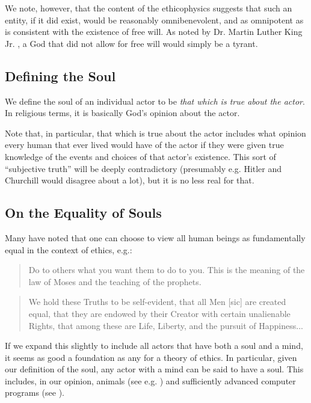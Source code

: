 \documentclass{article}
\begin{document}
We note, however, that the content of the ethicophysics suggests that
such an entity, if it did exist, would be reasonably omnibenevolent,
and as omnipotent as is consistent with the existence of free will.
As noted by Dr. Martin Luther King Jr. \cite{king1963tough}, a God that
did not allow for free will would simply be a tyrant.

\subsection{Defining the Soul}

We define the soul of an individual actor to be {\em that which is
  true about the actor}. In religious terms, it is basically God's
opinion about the actor.

Note that, in particular, that which is true about the actor includes
what opinion every human that ever lived would have of the actor if
they were given true knowledge of the events and choices of that
actor's existence. This sort of ``subjective truth'' will be deeply
contradictory (presumably e.g. Hitler and Churchill would disagree
about a lot), but it is no less real for that.

\subsection{On the Equality of Souls}

Many have noted that one can choose to view all human beings as
fundamentally equal in the context of ethics, e.g.:

\begin{quote}
  Do to others what you want them to do to you. This is the meaning of
  the law of Moses and the teaching of the prophets. \cite{mount}
\end{quote}

\begin{quote}
  We hold these Truths to be self-evident, that all Men [sic] are
  created equal, that they are endowed by their Creator with certain
  unalienable Rights, that among these are Life, Liberty, and the
  pursuit of Happiness... \cite{independence}
\end{quote}

If we expand this slightly to include all actors that have both a soul
and a mind, it seems as good a foundation as any for a theory of
ethics. In particular, given our definition of the soul, any actor
with a mind can be said to have a soul. This includes, in our opinion,
animals (see e.g. \cite{singer1995animal, coetzee1999lives}) and
sufficiently advanced computer programs (see
\cite{turing1954computing}).
\end{document}

